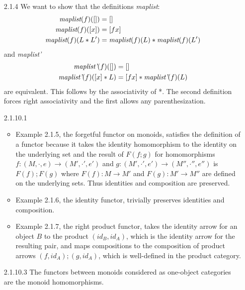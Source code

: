 \documentclass{article}
\begin{document}
\begin{enumerate}
\item[2.1.4]
  We want to show that the definitions \emph{maplist}:
  \begin{align*}
    \emph{maplist}(f)([]) &= []
    \\ \emph{maplist}(f)([x]) &= [f x]
    \\ \emph{maplist}(f)(L * L') &= \emph{maplist}(f)(L) * \emph{maplist}(f)(L')
  \end{align*}
  and \emph{maplist'}
  \begin{align*}
    \emph{maplist'}(f)([]) &= []
    \\ \emph{maplist'}(f)([x] * L) &= [f x] * \emph{maplist'}(f)(L)
  \end{align*}
  are equivalent.
  This follows by the associativity of *.
  The second definition forces right associativity and the first allows any parenthesization.

\item[2.1.10.1]
  \begin{itemize}
  \item Example 2.1.5, the forgetful functor on monoids, satisfies the definition of a functor because it takes the identity homomorphism to the identity on the underlying set and the result of $F (f;g)$ for homomorphisms $f : (M,\cdot,e) \rightarrow (M',\cdot',e')$ and $g : (M',\cdot', e') \rightarrow (M'',\cdot'',e'')$ is $F(f); F(g)$ where $F(f) : M \rightarrow M'$ and $F(g) : M' \rightarrow M''$ are defined on the underlying sets. 
    Thus identities and composition are preserved.
  \item Example 2.1.6, the identity functor, trivially preserves identities and composition.
  \item Example 2.1.7, the right product functor, takes the identity arrow for an object $B$ to the product $(id_B, id_A)$, which is the identity arrow for the resulting pair, and maps compositions to the composition of product arrows $(f,id_A); (g,id_A)$, which is well-defined in the product category.
  \end{itemize}

\item[2.1.10.3] The functors between monoids considered as one-object categories are the monoid homomorphisms.
\end{enumerate}
\end{document}
